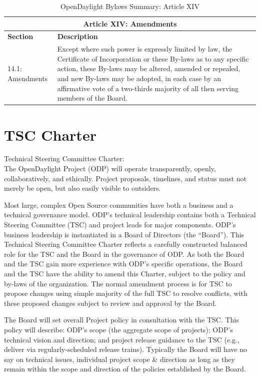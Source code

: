 \documentclass[a4paper, 12pt]{book}
\begin{document}
\begin{table}[H]
  \begin{center}
    \begin{tabular}{ | p{3cm} | p{12cm} | }
    \toprule
    \multicolumn {2}{|c|}{\textbf{Article XIV: Amendments}} \\
    \hline
    \textbf{Section} & \textbf{Description} \\
    \hline
    14.1: Amendments & Except where such power is expressly limited by law, the Certificate of Incorporation or these By-laws as to any specific action, these By-laws may be altered, amended or repealed, and new By-laws may be adopted, in each case by an affirmative vote of a two-thirds majority of all then serving members of the Board.\\
    \bottomrule
    \end{tabular}
    \caption{OpenDaylight Bylaws Summary: Article XIV}
    \label{tab:odlbylaws-art14}
  \end{center}
\end{table}

\chapter{TSC Charter}
\label{chap:appendix_tsccharter}
Technical Steering Committee Charter:\\
The OpenDaylight Project (ODP) will operate transparently, openly, collaboratively, and ethically.  Project proposals, timelines, and status must not merely be open, but also easily visible to outsiders.

Most large, complex Open Source communities have both a business and a technical governance model.  ODP's technical leadership contains both a Technical Steering Committee (TSC) and project leads for major components.  ODP's business leadership is instantiated in a Board of Directors (the “Board”).  This Technical Steering Committee Charter reflects a carefully constructed balanced role for the TSC and the Board in the governance of ODP.  As both the Board and the TSC gain more experience with ODP’s specific operations, the Board and the TSC have the ability to amend this Charter, subject to the policy and by-laws of the organization.  The normal amendment process is for TSC to propose changes using simple majority of the full TSC to resolve conflicts, with these proposed changes subject to review and approval by the Board.

The Board will set overall Project policy in consultation with the TSC.   This policy will describe:  ODP's scope (the aggregate scope of projects); ODP’s technical vision and direction; and project release guidance to the TSC (e.g., deliver via regularly-scheduled release trains).   Typically the Board will have no say on technical issues, individual project scope \& direction as long as they remain within the scope and direction of the policies established by the Board.
\end{document}
